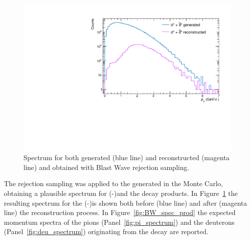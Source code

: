 \begin{figure} [htb]
    \centering
    \includegraphics[width=0.7 \textwidth]{gfx/genrecBW}
	\caption{Spectrum for both generated (blue line) and reconstructed (magenta line) \dsbar and \ds obtained with Blast Wave rejection sampling.}
	\label{fig:bw_spectrum}
\end{figure}

The rejection sampling was applied to the \ds generated in the Monte Carlo, obtaining a 
plausible \pt spectrum for (\dsbar-)\ds and the decay products. In Figure~\ref{fig:bw_spectrum} the
resulting \pt spectrum for the (\dsbar-)\ds is shown both before (blue line) and after (magenta line) the
reconstruction process. 
In Figure~\ref{fig:BW_spec_prod} the expected momentum spectra of the pions 
(Panel~\ref{fig:pi_spectrum}) and the deuterons (Panel~\ref{fig:deu_spectrum}) originating from
the \ds decay are reported.

